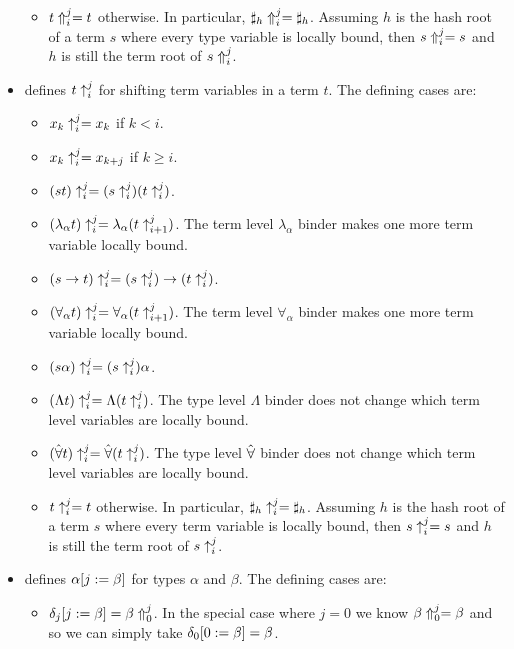 \begin{itemize}
\begin{itemize}
\item $\dbtpsh{i}{j}{t} = t$ otherwise. In particular, $\dbtpsh{i}{j}{\tmh{h}} = \tmh{h}$.
Assuming $h$ is the hash root of a term $s$ where every type variable is locally bound,
then $\dbtpsh{i}{j}{s} = s$
and $h$ is still the term root of $\dbtpsh{i}{j}{s}$.
\end{itemize}
\item {} defines $\dbsh{i}{j}{t}$ for shifting term variables in a term $t$.
The defining cases are:
\begin{itemize}
\item $\dbsh{i}{j}{x_k} = x_k$ if $k<i$.
\item $\dbsh{i}{j}{x_k} = x_{k+j}$ if $k\geq i$.
\item $\dbsh{i}{j}{(st)} = (\dbsh{i}{j}{s}) (\dbsh{i}{j}{t})$.
\item $\dbsh{i}{j}{(\lambda_\alpha t)} = \lambda_\alpha (\dbsh{i+1}{j}{t})$. The term level $\lambda_\alpha$ binder makes one more term variable locally bound.
\item $\dbsh{i}{j}{(s\to t)} = (\dbsh{i}{j}{s}) \to (\dbsh{i}{j}{t})$.
\item $\dbsh{i}{j}{(\forall_\alpha t)} = \forall_\alpha (\dbsh{i+1}{j}{t})$. The term level $\forall_\alpha$ binder makes one more term variable locally bound.
\item $\dbsh{i}{j}{(s\alpha)} = (\dbsh{i}{j}{s}) \alpha$.
\item $\dbsh{i}{j}{(\Lambda t)} = \Lambda (\dbsh{i}{j}{t})$. The type level $\Lambda$ binder does not change which term level variables are locally bound.
\item $\dbsh{i}{j}{(\tforall t)} = \tforall (\dbsh{i}{j}{t})$. The type level $\tforall$ binder does not change which term level variables are locally bound.
\item $\dbsh{i}{j}{t} = t$ otherwise. In particular, $\dbsh{i}{j}{\tmh{h}} = \tmh{h}$.
Assuming $h$ is the hash root of a term $s$ where every term variable is locally bound,
then $\dbsh{i}{j}{s} = s$
and $h$ is still the term root of $\dbsh{i}{j}{s}$.
\end{itemize}
\item {} defines $\dbsub{j}{\beta}{\alpha}$ for types $\alpha$ and $\beta$.
The defining cases are:
\begin{itemize}
\item $\dbsub{j}{\beta}{\delta_j} = \dbtpsh{0}{j}{\beta}$.
In the special case where $j=0$ we know $\dbtpsh{0}{j}{\beta} = \beta$
and so we can simply take $\dbsub{0}{\beta}{\delta_0} = \beta$.

\end{itemize}
\end{itemize}
